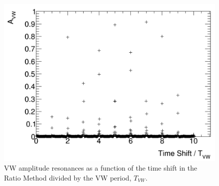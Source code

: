 \documentclass[12pt,letterpaper]{article}
\begin{document}
\begin{figure}[]
    \centering
    \includegraphics[width=.7\textwidth]{JamesAnalytic_Avw_Resonances}
    \caption[]{VW amplitude resonances as a function of the time shift in the Ratio Method divided by the VW period, $T_{VW}$.}
    \label{fig:JamesAnalytic_Avw_Resonances}
\end{figure}
\end{document}

